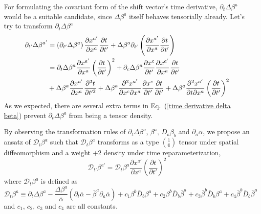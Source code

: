 \documentclass[letterpaper,nofootinbib,prd,amsmath,onecolumn]{revtex4-1}
\begin{document}
For formulating the covariant form of the shift vector's time derivative, $\partial_{t}\Delta \beta^{a}$ would be a suitable candidate, since $\Delta \beta^{a}$ itself behaves tensorially already. Let's try to transform $\partial_{t} \Delta \beta^{a}$
\begin{align}\label{time derivative delta beta} 
\partial_{t'}\Delta \beta^{a'} & = \left(\partial_{t'}\Delta \beta^{a}\right)\frac{\partial x^{a'}}{\partial x^{a}}\frac{\partial t}{\partial t'} + \Delta \beta^{a}\partial_{t'}\left(\frac{\partial x^{a'}}{\partial x^{a}}\frac{\partial t}{\partial t'}\right)\notag\\
& = \partial_{t}\Delta \beta^{a}\frac{\partial x^{a'}}{\partial x^{a}}\left(\frac{\partial t}{\partial t'}\right)^{2} + \partial_{c}\Delta \beta^{a}\frac{\partial x^{c}}{\partial t'}\frac{\partial x^{a'}}{\partial x^{a}}\frac{\partial t}{\partial t'}\notag\\
& + \Delta \beta^{a}\frac{\partial x^{a'}}{\partial x^{a}}\frac{\partial^{2}t}{\partial t'^{2}} + \Delta \beta^{a}\frac{\partial^{2} x^{a'}}{\partial x^{c}\partial x^{a}}\frac{\partial x^{c}}{\partial t'}\frac{\partial t}{\partial t'} + \Delta \beta^{a}\frac{\partial^{2}x^{a'}}{\partial t\partial x^{a}}\left(\frac{\partial t}{\partial t'}\right)^{2}
\end{align}
As we expected, there are several extra terms in Eq.~(\ref{time derivative delta beta}) prevent $\partial_{t}\Delta\beta^{a}$ from being a tensor density. 

By observing the transformation rules of $\partial_{t}\Delta\beta^{a}$, $\beta^{a}$, $D_{a}\beta_{b}$ and $\partial_{a}\alpha$, we propose an ansatz of $\mathscr{D}_{t}\beta^{a}$ such that $\mathscr{D}_{t}\beta^{a}$ transforms as a type $1 \choose 0$ tensor under spatial diffeomorphism and a weight +2 density under time reparameterization, 
\begin{equation}
\mathscr{D}_{t'}\beta^{a'} = \mathscr{D}_{t}\beta^{a}\frac{\partial x^{a'}}{\partial x^{a}}\left(\frac{\partial t}{\partial t'}\right)^{2}
\end{equation}
where $\mathscr{D}_{t}\beta^{a}$ is defined as
\begin{equation}
\mathscr{D}_{t}\beta^{a} \equiv \partial_{t}\Delta \beta^{a} - \frac{\Delta \beta^{a}}{{\bar \alpha}}\left(\partial_{t}{\bar \alpha} - {\bar \beta}^{a}\partial_{a}{\bar \alpha}\right) + c_{1}\beta^{b}{\bar D}_{b}\beta^{a} + c_{2}\beta^{b}{\bar D}_{b}{\bar \beta}^{a} + c_{3}{\bar \beta}^{b}{\bar D}_{b}\beta^{a} + c_{4}{\bar \beta}^{b}{\bar D}_{b}{\bar \beta}^{a}
\end{equation}
and $c_{1}$, $c_{2}$, $c_{3}$ and $c_{4}$ are all constants. 
\end{document}

